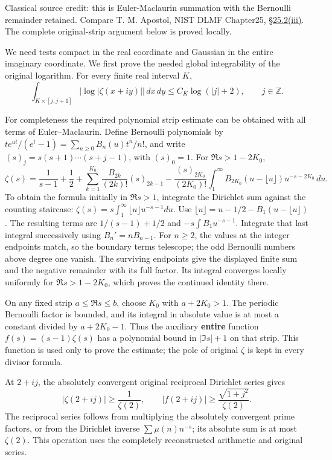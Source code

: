 Classical source credit: this is Euler-Maclaurin summation with the
Bernoulli remainder retained. Compare T. M. Apostol, NIST DLMF
Chapter25, \href{https://dlmf.nist.gov/25.2\#iii}{§25.2(iii)}. The
complete original-strip argument below is proved locally.

We need tests compact in the real coordinate and Gaussian in the entire
imaginary coordinate. We first prove the needed global integrability of
the original logarithm. For every finite real interval \(K\), \[
\int_{K\times[j,j+1]}|\log|\zeta(x+iy)||\,dx\,dy
\le C_K\log(|j|+2),\qquad j\in\mathbb Z.
\tag{OZD2.1}
\]

For completeness the required polynomial strip estimate can be obtained
with all terms of Euler--Maclaurin. Define Bernoulli polynomials by
\(te^{ut}/(e^t-1)=\sum_{n\ge0}B_n(u)t^n/n!\), and write
\((s)_j=s(s+1)\cdots(s+j-1)\), with \((s)_0=1\). For \(\Re s>1-2K_0\),
\[
\zeta(s)=\frac1{s-1}+\frac12
+\sum_{k=1}^{K_0}\frac{B_{2k}}{(2k)!}(s)_{2k-1}
-\frac{(s)_{2K_0}}{(2K_0)!}
\int_1^\infty B_{2K_0}(u-\lfloor u\rfloor)u^{-s-2K_0}\,du.
\tag{OZD2.2}
\] To obtain the formula initially in \(\Re s>1\), integrate the
Dirichlet sum against the counting staircase:
\(\zeta(s)=s\int_1^\infty\lfloor u\rfloor u^{-s-1}du\). Use
\(\lfloor u\rfloor=u-1/2-B_1(u-\lfloor u\rfloor)\). The resulting terms
are \(1/(s-1)+1/2\) and \(-s\int B_1u^{-s-1}\). Integrate that last
integral successively using \(B_n'=nB_{n-1}\). For \(n\ge2\), the values
at the integer endpoints match, so the boundary terms telescope; the odd
Bernoulli numbers above degree one vanish. The surviving endpoints give
the displayed finite sum and the negative remainder with its full
factor. Its integral converges locally uniformly for \(\Re s>1-2K_0\),
which proves the continued identity there.

On any fixed strip \(a\le\Re s\le b\), choose \(K_0\) with \(a+2K_0>1\).
The periodic Bernoulli factor is bounded, and its integral in absolute
value is at most a constant divided by \(a+2K_0-1\). Thus the auxiliary
\textbf{entire} function \(f(s)=(s-1)\zeta(s)\) has a polynomial bound
in \(|\Im s|+1\) on that strip. This function is used only to prove the
estimate; the pole of original \(\zeta\) is kept in every divisor
formula.

At \(2+ij\), the absolutely convergent original reciprocal Dirichlet
series gives \[
|\zeta(2+ij)|\ge\frac1{\zeta(2)},\qquad
|f(2+ij)|\ge\frac{\sqrt{1+j^2}}{\zeta(2)}.
\tag{OZD2.3}
\] The reciprocal series follows from multiplying the absolutely
convergent prime factors, or from the Dirichlet inverse
\(\sum\mu(n)n^{-s}\); its absolute sum is at most \(\zeta(2)\). This
operation uses the completely reconstructed arithmetic and original
series.


